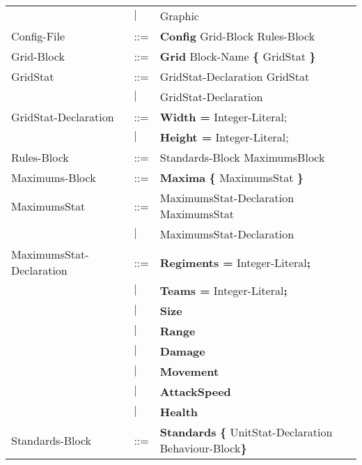 \begin{center}
\begin{longtable}{l l l}
									&$\mid$	&Graphic\\
		Config-File					&	::=	&{\bf Config} Grid-Block Rules-Block\\
		Grid-Block					&	::=	&{\bf Grid} Block-Name	 {\bf \{} GridStat \bf{\}}\\
		GridStat					&	::=	&GridStat-Declaration GridStat\\
									&$\mid$	&GridStat-Declaration \\
		GridStat-Declaration		&	::=	&{\bf Width = } Integer-Literal;\\
									&$\mid$	&{\bf Height = } Integer-Literal;\\
		Rules-Block					&	::=	&Standards-Block MaximumsBlock\\
		Maximums-Block				&	::=	&{\bf Maxima} {\bf \{} MaximumsStat {\bf \}} \\
		MaximumsStat				&	::=	&MaximumsStat-Declaration MaximumsStat\\
									&$\mid$	&MaximumsStat-Declaration\\
		MaximumsStat-Declaration	&	::=	&{\bf Regiments = } Integer-Literal{\bf ;}\\
									&$\mid$	&{\bf Teams = } Integer-Literal{\bf ;}\\
									&$\mid$	&{\bf Size}\\
									&$\mid$	&{\bf Range}\\
									&$\mid$	&{\bf Damage}\\
									&$\mid$	&{\bf Movement}\\
									&$\mid$	&{\bf AttackSpeed}\\
									&$\mid$	&{\bf Health}\\
		Standards-Block				&	::=	&{\bf Standards} {\bf \{ } UnitStat-Declaration Behaviour-Block\bf{\} }\\
		\end{longtable}
		\end{center}
		
